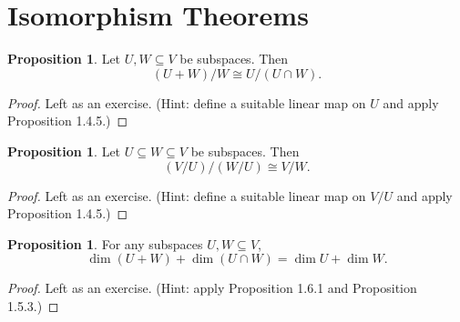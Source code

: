 \documentclass{book}
\theoremstyle{definition}
\newtheorem{proposition}[definition]{Proposition}
\begin{document}
\section{Isomorphism Theorems}

\begin{proposition}
Let $U, W \subseteq V$ be subspaces. Then
\[
(U + W) / W \cong U / (U \cap W).
\]
\end{proposition}

\begin{proof}
Left as an exercise. (Hint: define a suitable linear map on $U$ and apply Proposition 1.4.5.)
\end{proof}

\begin{proposition}
Let $U \subseteq W \subseteq V$ be subspaces. Then
\[
(V / U) \big/ (W / U) \cong V / W.
\]
\end{proposition}

\begin{proof}
Left as an exercise. (Hint: define a suitable linear map on $V/U$ and apply Proposition 1.4.5.)
\end{proof}

\begin{proposition}
For any subspaces $U, W \subseteq V$,
\[
\dim(U + W) + \dim(U \cap W) = \dim U + \dim W.
\]
\end{proposition}

\begin{proof}
Left as an exercise. (Hint: apply Proposition 1.6.1 and Proposition 1.5.3.)
\end{proof}
\end{document}
